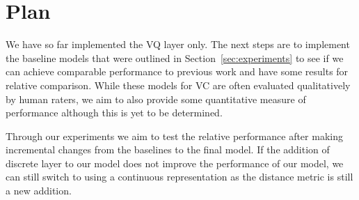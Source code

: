 \documentclass{article}
\begin{document}

\section{Plan}
\label{sec:plan}

We have so far implemented the VQ layer only. The next steps are to implement the baseline models that were outlined in Section~\ref{sec:experiments} to see if we can achieve comparable performance to previous work and have some results for relative comparison. While these models for VC are often evaluated qualitatively by human raters, we aim to also provide some quantitative measure of performance although this is yet to be determined. 

Through our experiments we aim to test the relative performance after making incremental changes from the baselines to the final model. If the addition of discrete layer to our model does not improve the performance of our model, we can still switch to using a continuous representation as the distance metric is still a new addition.


\end{document}
